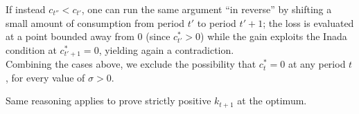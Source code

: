If instead $c_{t''}<c_{t'}$, one can run the same argument ``in reverse'' by shifting a small amount of consumption from period $t'$ to period $t'+1$; the loss is evaluated at a point bounded away from $0$ (since $c_{ t'}^*>0$) while the gain exploits the Inada condition at $c_{ t'+1}^*=0$, yielding again a contradiction. \\
Combining the cases above, we exclude the possibility that $c_t^*=0$ at any period $t$, for every value of $\sigma>0$. 

Same reasoning applies to prove strictly positive $k_{t+1}$ at the optimum.